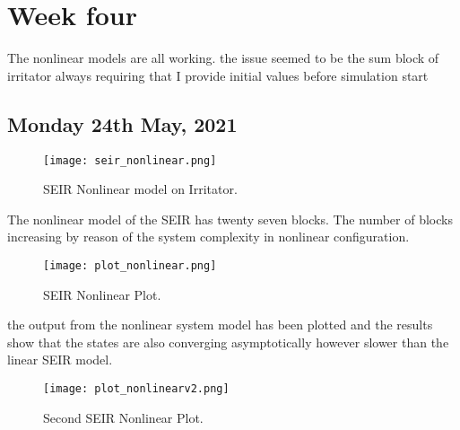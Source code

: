 \documentclass[a4paper, 12pt, notitlepage]{report}
\begin{document}


\section{Week four}
The nonlinear models are all working. the issue seemed to be the sum block of irritator always requiring that I provide initial values before simulation start

\subsection{Monday 24th May, 2021}

\begin{figure}[htbp]
\centerline{\texttt{[image: seir\_nonlinear.png]}}
\caption{SEIR Nonlinear model on Irritator.}
\label{fig}
\end{figure}

The nonlinear model of the SEIR has twenty seven blocks. The number of blocks increasing by reason of the system complexity in nonlinear configuration.

\begin{figure}[htbp]
\centerline{\texttt{[image: plot\_nonlinear.png]}}
\caption{SEIR Nonlinear Plot.}
\label{fig}
\end{figure}

the output from the nonlinear system model has been plotted and the results show that the states are also converging asymptotically however slower than the linear SEIR model.

\begin{figure}[htbp]
\centerline{\texttt{[image: plot\_nonlinearv2.png]}}
\caption{Second SEIR Nonlinear Plot.}
\label{fig}
\end{figure}
\end{document}
